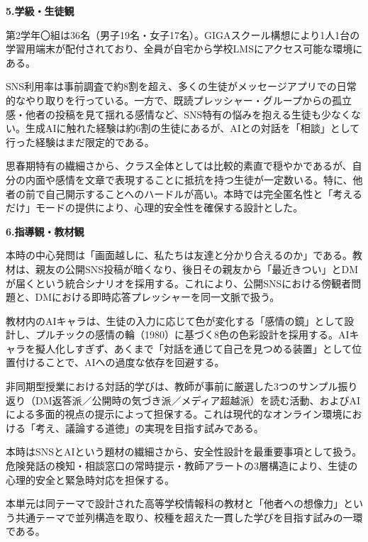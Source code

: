 \documentclass[uplatex,a4paper,11pt]{jsarticle}
\newcommand{\itemhead}[2]{\par\medskip\noindent\textbf{#1.\quad #2}\par\nopagebreak\smallskip}
\begin{document}
\itemhead{5}{学級・生徒観}
\hspace{1zw}第2学年〇組は36名（男子19名・女子17名）。GIGAスクール構想により1人1台の学習用端末が配付されており、全員が自宅から学校LMSにアクセス可能な環境にある。\par
\hspace{1zw}SNS利用率は事前調査で約8割を超え、多くの生徒がメッセージアプリでの日常的なやり取りを行っている。一方で、既読プレッシャー・グループからの孤立感・他者の投稿を見て揺れる感情など、SNS特有の悩みを抱える生徒も少なくない。生成AIに触れた経験は約6割の生徒にあるが、AIとの対話を「相談」として行った経験はまだ限定的である。\par
\hspace{1zw}思春期特有の繊細さから、クラス全体としては比較的素直で穏やかであるが、自分の内面や感情を文章で表現することに抵抗を持つ生徒が一定数いる。特に、他者の前で自己開示することへのハードルが高い。本時では完全匿名性と「考えるだけ」モードの提供により、心理的安全性を確保する設計とした。\par

\itemhead{6}{指導観・教材観}
\hspace{1zw}本時の中心発問は「画面越しに、私たちは友達と分かり合えるのか」である。教材は、親友の公開SNS投稿が暗くなり、後日その親友から「最近きつい」とDMが届くという統合シナリオを採用する。これにより、公開SNSにおける傍観者問題と、DMにおける即時応答プレッシャーを同一文脈で扱う。\par
\hspace{1zw}教材内のAIキャラは、生徒の入力に応じて色が変化する「感情の鏡」として設計し、プルチックの感情の輪（1980）に基づく8色の色彩設計を採用する。AIキャラを擬人化しすぎず、あくまで「対話を通じて自己を見つめる装置」として位置付けることで、AIへの過度な依存を回避する。\par
\hspace{1zw}非同期型授業における対話的学びは、教師が事前に厳選した3つのサンプル振り返り（DM返答派／公開時の気づき派／メディア超越派）を読む活動、およびAIによる多面的視点の提示によって担保する。これは現代的なオンライン環境における「考え、議論する道徳」の実現を目指す試みである。\par
\hspace{1zw}本時はSNSとAIという題材の繊細さから、安全性設計を最重要事項として扱う。危険発話の検知・相談窓口の常時提示・教師アラートの3層構造により、生徒の心理的安全と緊急時対応を担保する。\par
\hspace{1zw}本単元は同テーマで設計された高等学校情報科の教材と「他者への想像力」という共通テーマで並列構造を取り、校種を超えた一貫した学びを目指す試みの一環である。\par
\end{document}

